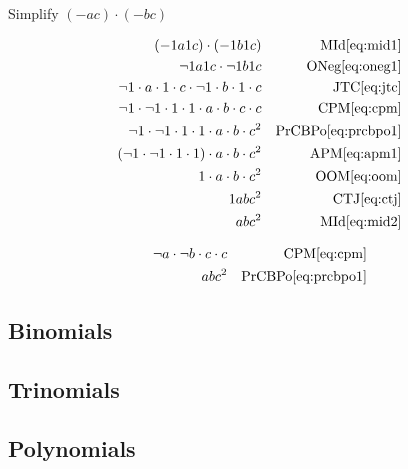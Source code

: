 \begin{example}[id:20141108-192611] \label{20141108-192611}  \hfill \\

Simplify $(-ac) \cdot (-bc)$

\soln

\solnsteps
\begin{align*}
(-1a1c)\cdot (-1b1c) && \text{MId} \eqref{eq:mid1} \\
\neg 1a1c \cdot \neg 1b1c && \text{ONeg} \eqref{eq:oneg1} \\
\neg 1 \cdot a \cdot 1 \cdot c \cdot \neg 1 \cdot b \cdot 1 \cdot c && \text{JTC} \eqref{eq:jtc} \\
\neg 1 \cdot \neg 1 \cdot 1 \cdot 1 \cdot a \cdot b \cdot c \cdot c && \text{CPM} \eqref{eq:cpm} \\
\neg 1 \cdot \neg 1 \cdot 1 \cdot 1 \cdot a \cdot b \cdot c^2 && \text{PrCBPo} \eqref{eq:prcbpo1} \\
(\neg 1 \cdot \neg 1 \cdot 1 \cdot 1) \cdot a \cdot b \cdot c^2 && \text{APM} \eqref{eq:apm1} \\
1 \cdot a \cdot b \cdot c^2 && \text{OOM} \eqref{eq:oom} \\
1abc^2 && \text{CTJ} \eqref{eq:ctj} \\
abc^2 && \text{MId} \eqref{eq:mid2} 
\end{align*}

\soln

\lesssteps
\begin{align*}
\neg a \cdot \neg b \cdot c \cdot c && \text{CPM} \eqref{eq:cpm} \\
abc^2 && \text{PrCBPo} \eqref{eq:prcbpo1} \\  
\end{align*}

\end{example}

\subsection*{Binomials}

\subsection*{Trinomials}

\subsection*{Polynomials}